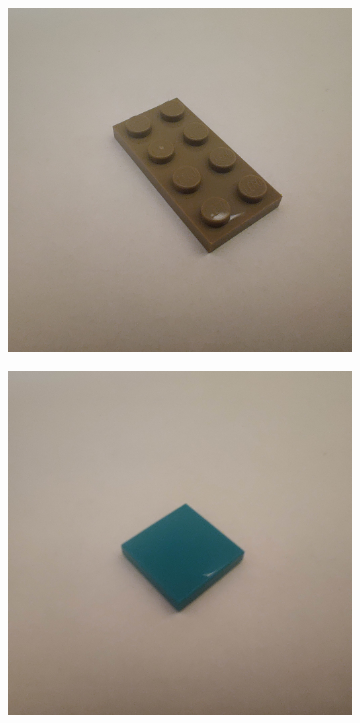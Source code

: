 \documentclass[]{article}
\begin{document}
\begin{figure}[h]
\begin{subfigure}[b]{0.2\textwidth}
    \end{subfigure}
    \begin{subfigure}[b]{0.2\textwidth}
        \includegraphics[width=\textwidth]{photographed images/15.jpg}
    \end{subfigure}
    \begin{subfigure}[b]{0.2\textwidth}
        \includegraphics[width=\textwidth]{photographed images/16.jpg}

\end{subfigure}
\end{figure}
\end{document}
